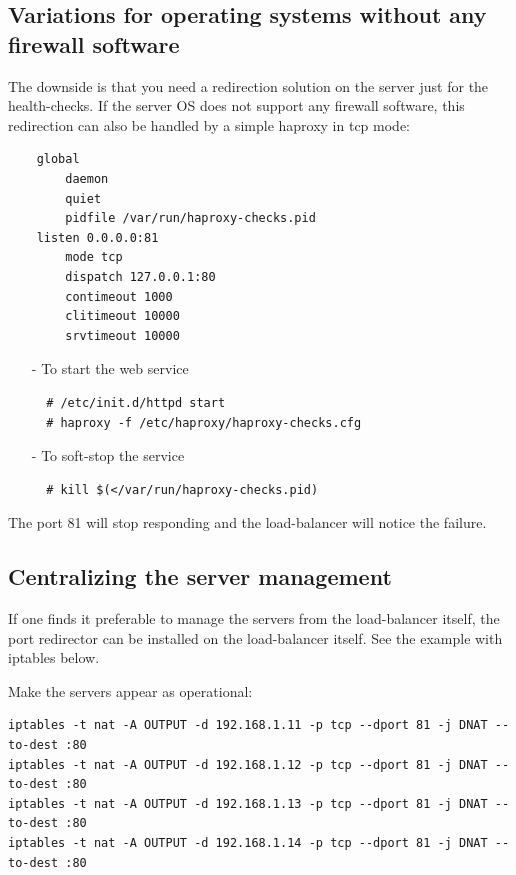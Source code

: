 \subsection{Variations for operating systems without any firewall software}

The downside is that you need a redirection solution on the server just for
the health-checks. If the server OS does not support any firewall software,
this redirection can also be handled by a simple haproxy in tcp mode:

\begin{verbatim}
    global
        daemon
        quiet
        pidfile /var/run/haproxy-checks.pid
    listen 0.0.0.0:81
        mode tcp
        dispatch 127.0.0.1:80
        contimeout 1000
        clitimeout 10000
        srvtimeout 10000
\end{verbatim}

\begin{itemize}
\item[-] To start the web service
\begin{verbatim}
  # /etc/init.d/httpd start
  # haproxy -f /etc/haproxy/haproxy-checks.cfg
\end{verbatim}
\item[-] To soft-stop the service
\begin{verbatim}
  # kill $(</var/run/haproxy-checks.pid)
\end{verbatim}
\end{itemize}

The port 81 will stop responding and the load-balancer will notice the failure.

\subsection{Centralizing the server management}

If one finds it preferable to manage the servers from the load-balancer itself,
the port redirector can be installed on the load-balancer itself. See the
example with iptables below.

Make the servers appear as operational:

\small{
\begin{verbatim}
iptables -t nat -A OUTPUT -d 192.168.1.11 -p tcp --dport 81 -j DNAT --to-dest :80
iptables -t nat -A OUTPUT -d 192.168.1.12 -p tcp --dport 81 -j DNAT --to-dest :80
iptables -t nat -A OUTPUT -d 192.168.1.13 -p tcp --dport 81 -j DNAT --to-dest :80
iptables -t nat -A OUTPUT -d 192.168.1.14 -p tcp --dport 81 -j DNAT --to-dest :80
\end{verbatim}
}

